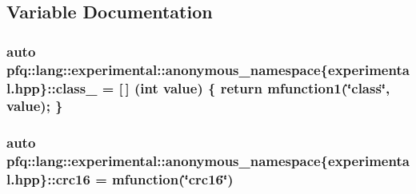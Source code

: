 \subsection{Variable Documentation}
\hypertarget{namespacepfq_1_1lang_1_1experimental_1_1anonymous__namespace_02experimental_8hpp_03_a55ce0b220b42a47460d1d40d3d5fdd5d}{
\subsubsection[{class\+\_\+}]{\setlength{\rightskip}{0pt plus 5cm}auto pfq\+::lang\+::experimental\+::anonymous\+\_\+namespace\{experimental.\+hpp\}\+::class\+\_\+ = \mbox{[}$\,$\mbox{]} (int value) \{ return {\bf mfunction1}(\char`\"{}class\char`\"{}, value); \}}}\label{namespacepfq_1_1lang_1_1experimental_1_1anonymous__namespace_02experimental_8hpp_03_a55ce0b220b42a47460d1d40d3d5fdd5d}
\hypertarget{namespacepfq_1_1lang_1_1experimental_1_1anonymous__namespace_02experimental_8hpp_03_a8152d34c5c69cc26aaa2b4a14ed37af1}{
\subsubsection[{crc16}]{\setlength{\rightskip}{0pt plus 5cm}auto pfq\+::lang\+::experimental\+::anonymous\+\_\+namespace\{experimental.\+hpp\}\+::crc16 = {\bf mfunction}(\char`\"{}crc16\char`\"{})}}\label{namespacepfq_1_1lang_1_1experimental_1_1anonymous__namespace_02experimental_8hpp_03_a8152d34c5c69cc26aaa2b4a14ed37af1}
